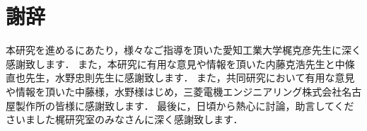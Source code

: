 \chapter*{謝辞}

本研究を進めるにあたり，様々なご指導を頂いた愛知工業大学梶克彦先生に深く感謝致します．
また，本研究に有用な意見や情報を頂いた内藤克浩先生と中條直也先生，水野忠則先生に感謝致します．
また，共同研究において有用な意見や情報を頂いた中藤様，水野様はじめ，三菱電機エンジニアリング株式会社名古屋製作所の皆様に感謝致します．
最後に，日頃から熱心に討論，助言してくださいました梶研究室のみなさんに深く感謝致します．

